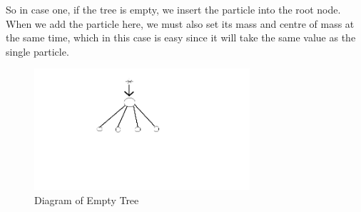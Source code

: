 So in case one, if the tree is empty, we insert the particle into the root node. When we add the particle here, we must also set its mass and centre of mass at the same time, which in this case is easy since it will take the same value as the single particle.
\begin{figure}[htb]
    \begin{center}
        \includegraphics[width=8cm]{../images/empty_tree.png}
        \caption{Diagram of Empty Tree}
    \end{center}
\end{figure}

